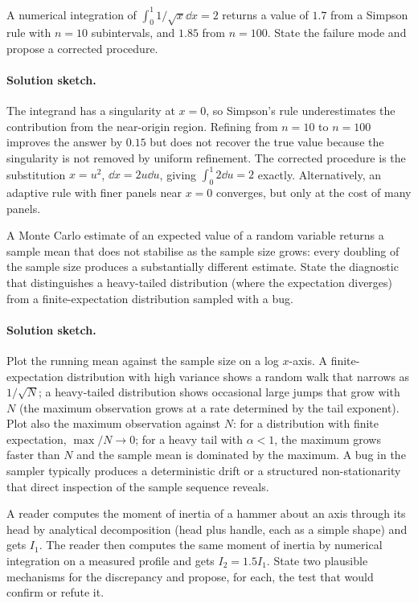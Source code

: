 \begin{exercise}
A numerical integration of $\int_{0}^{1} 1/\sqrt{x} \dd x = 2$
returns a value of $1.7$ from a Simpson rule with $n = 10$
subintervals, and $1.85$ from $n = 100$. State the failure mode
and propose a corrected procedure.
\end{exercise}

\paragraph{Solution sketch.}
The integrand has a singularity at $x = 0$, so Simpson's rule
underestimates the contribution from the near-origin region.
Refining from $n = 10$ to $n = 100$ improves the answer by $0.15$
but does not recover the true value because the singularity is
not removed by uniform refinement. The corrected procedure is the
substitution $x = u^{2}$, $\dd x = 2 u \dd u$, giving
$\int_{0}^{1} 2 \dd u = 2$ exactly. Alternatively, an adaptive
rule with finer panels near $x = 0$ converges, but only at the
cost of many panels.

\begin{exercise}
A Monte Carlo estimate of an expected value of a random variable
returns a sample mean that does not stabilise as the sample size
grows: every doubling of the sample size produces a substantially
different estimate. State the diagnostic that distinguishes a
heavy-tailed distribution (where the expectation diverges) from a
finite-expectation distribution sampled with a bug.
\end{exercise}

\paragraph{Solution sketch.}
Plot the running mean against the sample size on a log $x$-axis.
A finite-expectation distribution with high variance shows a
random walk that narrows as $1/\sqrt{N}$; a heavy-tailed
distribution shows occasional large jumps that grow with $N$ (the
maximum observation grows at a rate determined by the tail
exponent). Plot also the maximum observation against $N$: for a
distribution with finite expectation, $\max / N \to 0$; for a
heavy tail with $\alpha < 1$, the maximum grows faster than $N$
and the sample mean is dominated by the maximum. A bug in the
sampler typically produces a deterministic drift or a structured
non-stationarity that direct inspection of the sample sequence
reveals.

\begin{exercise}
A reader computes the moment of inertia of a hammer about an axis
through its head by analytical decomposition (head plus handle,
each as a simple shape) and gets $I_{1}$. The reader then computes
the same moment of inertia by numerical integration on a measured
profile and gets $I_{2} = 1.5 I_{1}$. State two plausible
mechanisms for the discrepancy and propose, for each, the test
that would confirm or refute it.
\end{exercise}

